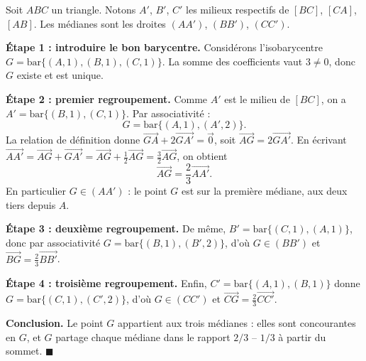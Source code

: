 \documentclass[11pt]{article}
\begin{document}
\begin{experience}
Soit $ABC$ un triangle. Notons $A'$, $B'$, $C'$ les milieux respectifs de $[BC]$, $[CA]$, $[AB]$. Les médianes sont les droites $(AA')$, $(BB')$, $(CC')$.

\textbf{Étape 1 : introduire le bon barycentre.} Considérons l'isobarycentre $G=\mathrm{bar}\{(A,1),(B,1),(C,1)\}$. La somme des coefficients vaut $3\neq 0$, donc $G$ existe et est unique.

\textbf{Étape 2 : premier regroupement.} Comme $A'$ est le milieu de $[BC]$, on a $A'=\mathrm{bar}\{(B,1),(C,1)\}$. Par associativité :
\[
G=\mathrm{bar}\{(A,1),(A',2)\}.
\]
La relation de définition donne $\overrightarrow{GA}+2\overrightarrow{GA'}=\vec{0}$, soit $\overrightarrow{AG}=2\overrightarrow{GA'}$. En écrivant $\overrightarrow{AA'}=\overrightarrow{AG}+\overrightarrow{GA'}=\overrightarrow{AG}+\tfrac{1}{2}\overrightarrow{AG}=\tfrac{3}{2}\overrightarrow{AG}$, on obtient
\[
\overrightarrow{AG}=\frac{2}{3}\overrightarrow{AA'}.
\]
En particulier $G\in(AA')$ : le point $G$ est sur la première médiane, aux deux tiers depuis $A$.

\textbf{Étape 3 : deuxième regroupement.} De même, $B'=\mathrm{bar}\{(C,1),(A,1)\}$, donc par associativité $G=\mathrm{bar}\{(B,1),(B',2)\}$, d'où $G\in(BB')$ et $\overrightarrow{BG}=\tfrac{2}{3}\overrightarrow{BB'}$.

\textbf{Étape 4 : troisième regroupement.} Enfin, $C'=\mathrm{bar}\{(A,1),(B,1)\}$ donne $G=\mathrm{bar}\{(C,1),(C',2)\}$, d'où $G\in(CC')$ et $\overrightarrow{CG}=\tfrac{2}{3}\overrightarrow{CC'}$.

\textbf{Conclusion.} Le point $G$ appartient aux trois médianes : elles sont concourantes en $G$, et $G$ partage chaque médiane dans le rapport $2/3$ -- $1/3$ à partir du sommet. $\blacksquare$
\end{experience}
\end{document}
